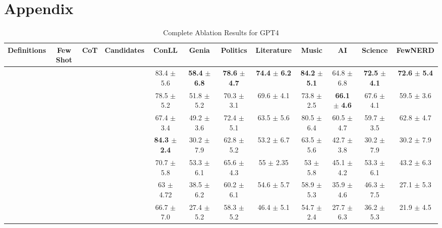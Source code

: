 \documentclass[11pt]{article}
\newcommand{\cmark}{\ding{51}}\newcommand{\xmark}{\ding{55}}\newcommand{\toolname}{PromptNER }
\begin{document}
\section{Appendix}
\label{sec:appendix}
\begin{landscape}
\begin{table}[]
\begin{tabular}{cccccccccccc}
\hline
Definitions & Few Shot & CoT   & Candidates & ConLL                  & Genia            & Politics               & Literature            & Music                    & AI                    & Science & FewNERD                \\\hline
\cmark        & \cmark     & \cmark  & \cmark       & 83.4 $\pm$ 5.6          & \textbf{58.4 } $\pm$ \textbf{ 6.8} & \textbf{78.6 } $\pm$ \textbf{ 4.7} & \textbf{74.4 } $\pm$ \textbf{ 6.2} & \textbf{84.2 } $\pm$ \textbf{ 5.1} & 64.8 $\pm$ 6.8          & \textbf{72.5 } $\pm$ \textbf{ 4.1} & \textbf{72.6 } $\pm$ \textbf{ 5.4} \\
\cmark        & \cmark     & \cmark  & \xmark      & 78.5 $\pm$ 5.2          & 51.8 $\pm$ 5.2          & 70.3 $\pm$ 3.1          & 69.6 $\pm$ 4.1          & 73.8 $\pm$ 2.5          & \textbf{66.1 } $\pm$ \textbf{ 4.6} & 67.6 $\pm$ 4.1          & 59.5 $\pm$ 3.6          \\
\cmark        & \cmark     & \xmark & \cmark       & 67.4 $\pm$ 3.4          & 49.2 $\pm$ 3.6          & 72.4 $\pm$ 5.1          & 63.5 $\pm$ 5.6          & 80.5 $\pm$ 6.4          & 60.5 $\pm$ 4.7          & 59.7 $\pm$ 3.5          & 62.8 $\pm$ 4.7          \\
\cmark        & \xmark    & \cmark  & \cmark       & \textbf{84.3 $\pm$ 2.4} & 30.2 $\pm$ 7.9          & 62.8 $\pm$ 5.2          & 53.2 $\pm$ 6.7          & 63.5 $\pm$ 5.6          & 42.7 $\pm$ 3.8          & 30.2 $\pm$ 7.9          & 30.2 $\pm$ 7.9          \\
\xmark       & \cmark     & \cmark  & \cmark       & 70.7 $\pm$ 5.8          & 53.3 $\pm$ 6.1          & 65.6 $\pm$ 4.3          & 55 $\pm$ 2.35           & 53 $\pm$ 5.8            & 45.1 $\pm$ 4.2          & 53.3 $\pm$ 6.1          & 43.2 $\pm$ 6.3          \\
\xmark       & \cmark     & \cmark  & \xmark      & 63 $\pm$ 4.72           & 38.5 $\pm$ 6.2          & 60.2 $\pm$ 6.1          & 54.6 $\pm$ 5.7          & 58.9 $\pm$ 5.3          & 35.9 $\pm$ 4.6          & 46.3 $\pm$ 7.5          & 27.1 $\pm$ 5.3          \\
\xmark       & \cmark     & \xmark & \xmark      & 66.7 $\pm$ 7.0          & 27.4 $\pm$ 5.2          & 58.3 $\pm$ 5.2          & 46.4 $\pm$ 5.1          & 54.7 $\pm$ 2.4          & 27.7 $\pm$ 6.3          & 36.2 $\pm$ 5.3          & 21.9 $\pm$ 4.5          \\\hline
\end{tabular}
\caption{Complete Ablation Results for GPT4}
\label{table:full_ablation}
\end{table}
\end{landscape}
\end{document}
